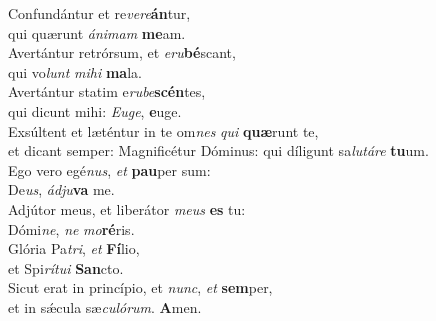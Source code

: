 \evenverse Confundántur et re\textit{ve}\textit{re}\textbf{án}tur,~\*\\
\evenverse qui quærunt \textit{á}\textit{ni}\textit{mam} \textbf{me}am.\\
\oddverse Avertántur retrórsum, et \textit{e}\textit{ru}\textbf{bé}scant,~\*\\
\oddverse qui vo\textit{lunt} \textit{mi}\textit{hi} \textbf{ma}la.\\
\evenverse Avertántur statim e\textit{ru}\textit{be}\textbf{scén}tes,~\*\\
\evenverse qui dicunt mihi: \textit{E}\textit{u}\textit{ge}, \textbf{e}uge.\\
\oddverse Exsúltent et læténtur in te om\textit{nes} \textit{qui} \textbf{quæ}runt te,~\*\\
\oddverse et dicant semper: Magnificétur Dóminus: qui díligunt sa\textit{lu}\textit{tá}\textit{re} \textbf{tu}um.\\
\evenverse Ego vero egé\textit{nus}, \textit{et} \textbf{pau}per sum:~\*\\
\evenverse De\textit{us}, \textit{ád}\textit{ju}\textbf{va} me.\\
\oddverse Adjútor meus, et liberátor \textit{me}\textit{us} \textbf{es} tu:~\*\\
\oddverse Dómi\textit{ne}, \textit{ne} \textit{mo}\textbf{ré}ris.\\
\evenverse Glória Pa\textit{tri}, \textit{et} \textbf{Fí}lio,~\*\\
\evenverse et Spi\textit{rí}\textit{tu}\textit{i} \textbf{San}cto.\\
\oddverse Sicut erat in princípio, et \textit{nunc}, \textit{et} \textbf{sem}per,~\*\\
\oddverse et in sǽcula sæ\textit{cu}\textit{ló}\textit{rum}. \textbf{A}men.\\
